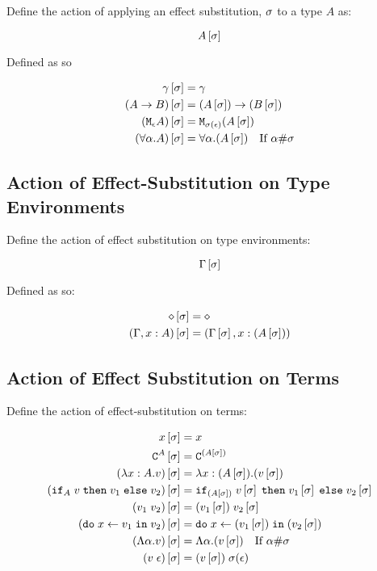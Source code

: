 {    Define the action of applying an effect substitution, $\si$ to a type $A$ as:

    $$A\sub{\si}$$

    Defined as so

    \begin{align}
        \g\sub{\si} &= \g \\
        (\fntype{A}{B})\sub{\si} &= \fntype{(A\sub{\si})}{(B\sub{\si})} \\
        (\M{\e}{A})\ssi &= \M{\si(\e)}{(A\ssi)}\\
        (\all{\a}{A})\ssi &= \all{\a}{(A\ssi)}\qt{If $\a\#\si$}
    \end{align}


    \subsection{Action of Effect-Substitution on Type Environments}

    Define the action of effect substitution on type environments:
    
    $$\G\ssi$$

    Defined as so:

    \begin{align*}
        \nil\ssi & = \nil \\
        (\gax)\ssi &= (\G\ssi, x:(A\ssi))\\
    \end{align*}


    \subsection{Action of Effect Substitution on Terms}

    Define the action of effect-substitution on terms:

    \begin{align}
        x\ssi & = x \\
        \const{A}\ssi & = \const{(A\ssi)} \\
        (\lam{x}{A}{v})\ssi &= \lam{x}{(A\ssi)}{(v\ssi)}\\
        (\pifthenelse{A}{v}{v_1}{v_2})\ssi &= \pifthenelse{(A\ssi)}{v\ssi}{v_1\ssi}{v_2\ssi}\\
        (\apply{v_1}{v_2})\ssi&= \apply{(v_1\ssi)}{v_2\ssi}\\
        (\doin{x}{v_1}{v_2})\ssi&= \doin{x}{(v_1\ssi)}{(v_2\ssi)}\\
        (\elam{\a}{v})\ssi & = \elam{\a}{(v\ssi)}\qt{If $\a\#\si$}\\
        (\eapp{v}{\e})\ssi & = \eapp{(v\ssi)}{\si(\e)}\\
    \end{align}


}
